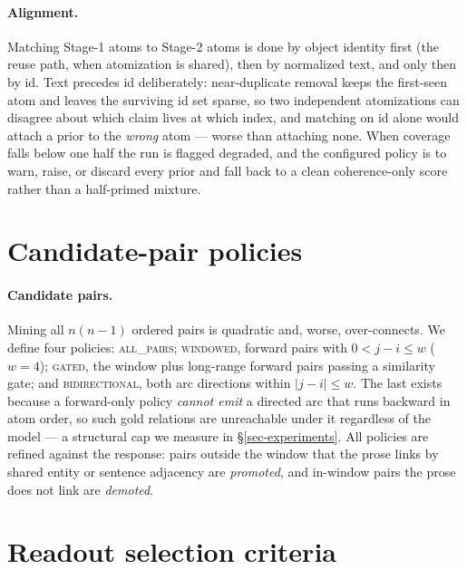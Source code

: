 \documentclass{article} %
\begin{document}
\paragraph{Alignment.} Matching Stage-1 atoms to Stage-2 atoms is done by object identity
first (the reuse path, when atomization is shared), then by normalized text, and only then
by id. Text precedes id deliberately: near-duplicate removal keeps the first-seen atom and
leaves the surviving id set sparse, so two independent atomizations can disagree about which
claim lives at which index, and matching on id alone would attach a prior to the
\emph{wrong} atom --- worse than attaching none. When coverage falls below one half the run
is flagged degraded, and the configured policy is to warn, raise, or discard every prior and
fall back to a clean coherence-only score rather than a half-primed mixture.

\section{Candidate-pair policies}
\label{app-pairs}

\paragraph{Candidate pairs.} Mining all $n(n-1)$ ordered pairs is quadratic and, worse,
over-connects. We define four policies: \textsc{all\_pairs}; \textsc{windowed}, forward
pairs with $0<j-i\le w$ ($w=4$); \textsc{gated}, the window plus long-range forward pairs
passing a similarity gate; and \textsc{bidirectional}, both arc directions within
$|j-i|\le w$. The last exists because a forward-only policy \emph{cannot emit} a directed
arc that runs backward in atom order, so such gold relations are unreachable under it
regardless of the model --- a structural cap we measure in \S\ref{sec-experiments}. All
policies are refined against the response: pairs outside the window that the prose links by
shared entity or sentence adjacency are \emph{promoted}, and in-window pairs the prose does
not link are \emph{demoted}.

\section{Readout selection criteria}
\label{app-criteria}
\end{document}

